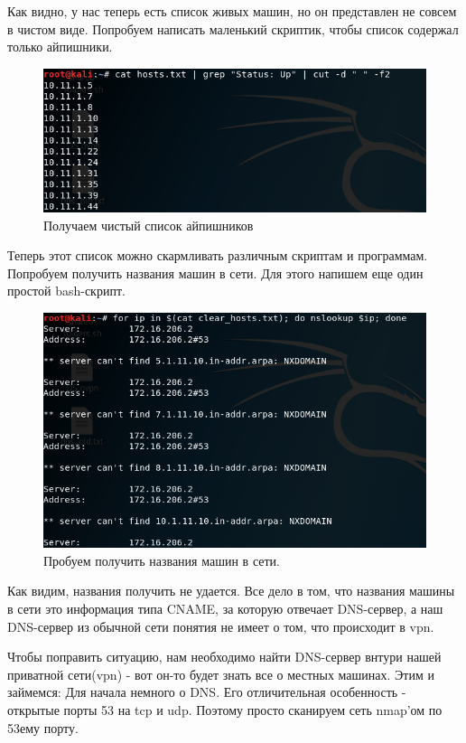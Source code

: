 \documentclass[a4paper,12pt]{article}
\begin{document}
Как видно, у нас теперь есть список живых машин, но он представлен не совсем в чистом виде. Попробуем написать маленький скриптик, чтобы список содержал только айпишники. 
\newpage
\begin{figure}[h!]
	\includegraphics[width=\linewidth]{cat_cut_3.png}
	\caption{Получаем чистый список айпишников}
	\label{fig:boat3}
\end{figure}

Теперь этот список можно скармливать различным скриптам и программам. Попробуем получить названия машин в сети. Для этого напишем еще один простой bash-скрипт. 	


\begin{figure}[h!]
	\includegraphics[width=\linewidth]{bad_nslookup_4.png}
	\caption{Пробуем получить названия машин в сети.}
	\label{fig:boat2}
\end{figure}

Как видим, названия получить не удается. Все дело в том, что названия машины в сети это информация типа CNAME, за которую отвечает DNS-сервер, а наш DNS-сервер из обычной сети понятия не имеет о том, что происходит в vpn.

Чтобы поправить ситуацию, нам необходимо найти DNS-сервер внтури нашей приватной сети(vpn) - вот он-то будет знать все о местных машинах. Этим и займемся:
Для начала немного о DNS. Его отличительная особенность - открытые порты 53 на tcp и udp. Поэтому просто сканируем сеть nmap'ом по 53ему порту.
\end{document}
